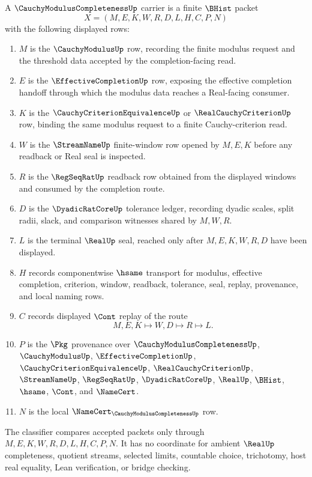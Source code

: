 \begin{definition}
\label{def:cauchy-modulus-completeness-carrier}
A $\CauchyModulusCompletenessUp$ carrier is a finite $\BHist$ packet
$$
X=(M,E,K,W,R,D,L,H,C,P,N)
$$
with the following displayed rows:
\begin{enumerate}
\item $M$ is the $\CauchyModulusUp$ row, recording the finite modulus request and the threshold data accepted by the completion-facing read.
\item $E$ is the $\EffectiveCompletionUp$ row, exposing the effective completion handoff through which the modulus data reaches a Real-facing consumer.
\item $K$ is the $\CauchyCriterionEquivalenceUp$ or $\RealCauchyCriterionUp$ row, binding the same modulus request to a finite Cauchy-criterion read.
\item $W$ is the $\StreamNameUp$ finite-window row opened by $M,E,K$ before any readback or Real seal is inspected.
\item $R$ is the $\RegSeqRatUp$ readback row obtained from the displayed windows and consumed by the completion route.
\item $D$ is the $\DyadicRatCoreUp$ tolerance ledger, recording dyadic scales, split radii, slack, and comparison witnesses shared by $M,W,R$.
\item $L$ is the terminal $\RealUp$ seal, reached only after $M,E,K,W,R,D$ have been displayed.
\item $H$ records componentwise $\hsame$ transport for modulus, effective completion, criterion, window, readback, tolerance, seal, replay, provenance, and local naming rows.
\item $C$ records displayed $\Cont$ replay of the route
$$
M,E,K \longmapsto W,D \longmapsto R \longmapsto L .
$$
\item $P$ is the $\Pkg$ provenance over $\CauchyModulusCompletenessUp$, $\CauchyModulusUp$, $\EffectiveCompletionUp$, $\CauchyCriterionEquivalenceUp$, $\RealCauchyCriterionUp$, $\StreamNameUp$, $\RegSeqRatUp$, $\DyadicRatCoreUp$, $\RealUp$, $\BHist$, $\hsame$, $\Cont$, and $\NameCert$.
\item $N$ is the local $\NameCert_{\CauchyModulusCompletenessUp}$ row.
\end{enumerate}
The classifier compares accepted packets only through $M,E,K,W,R,D,L,H,C,P,N$. It has no coordinate for ambient $\RealUp$ completeness, quotient streams, selected limits, countable choice, trichotomy, host real equality, Lean verification, or bridge checking.
\end{definition}

